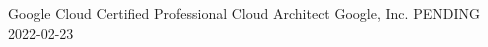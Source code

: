 \awarditem
    {Google Cloud Certified Professional Cloud Architect}
    {Google, Inc.}
    {PENDING}
    {2022-02-23}
